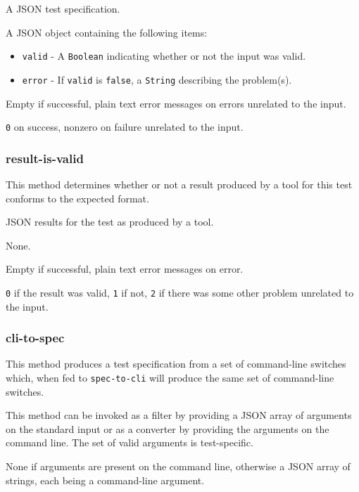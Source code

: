 \documentclass[10pt,titlepage]{article}
\begin{document}
 A JSON test specification.

 A JSON object containing the following
items:

\begin{itemize}
\item{\tt valid} - A {\tt Boolean} indicating whether or not the input
  was valid.
\item{\tt error} - If {\tt valid} is {\tt false}, a {\tt String}
  describing the problem(s).
\end{itemize}

 Empty if successful, plain text error
messages on errors unrelated to the input.

 {\tt 0} on success, nonzero on failure
unrelated to the input.



\subsubsection{result-is-valid}
This method determines whether or not a result produced by a tool for
this test conforms to the expected format.  

 JSON results for the test as produced by
a tool.

 None.

 Empty if successful, plain text error
messages on error.

 {\tt 0} if the result was valid, {\tt 1} if
not, {\tt 2} if there was some other problem unrelated to the input.



\subsubsection{cli-to-spec}
This method produces a test specification from a set of command-line
switches which, when fed to {\tt spec-to-cli} will produce the same
set of command-line switches.

This method can be invoked as a filter by providing a JSON array of
arguments on the standard input or as a converter by providing the
arguments on the command line.  The set of valid arguments is
test-specific.

 None if arguments are present on the
command line, otherwise a JSON array of strings, each being a
command-line argument.
\end{document}
